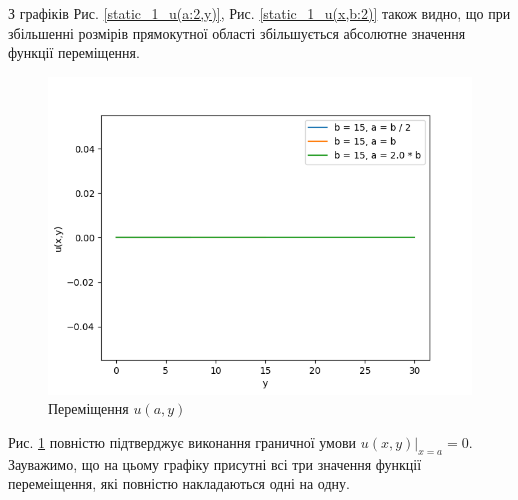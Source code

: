 З графіків Рис. \ref{static_1_u(a:2,y)}, Рис. \ref{static_1_u(x,b:2)} також видно,
що при збільшенні розмірів прямокутної області збільшується абсолютне значення функції переміщення.

\newpage
\begin{figure}[h!]
    \begin{center}
        \includegraphics[width=1\textwidth, scale=0.8]{images/results/static_1/u(a,y).png}
        \caption{Переміщення $u(a, y)$}\label{static_1_u(a,y)}
    \end{center}
\end{figure}

Рис. \ref{static_1_u(a,y)} повністю підтверджує виконання граничної умови
\newline $u(x,y) |_{x=a}=0$.
Зауважимо, що на цьому графіку присутні всі три значення функції перемеіщення, які повністю накладаються одні на одну.

